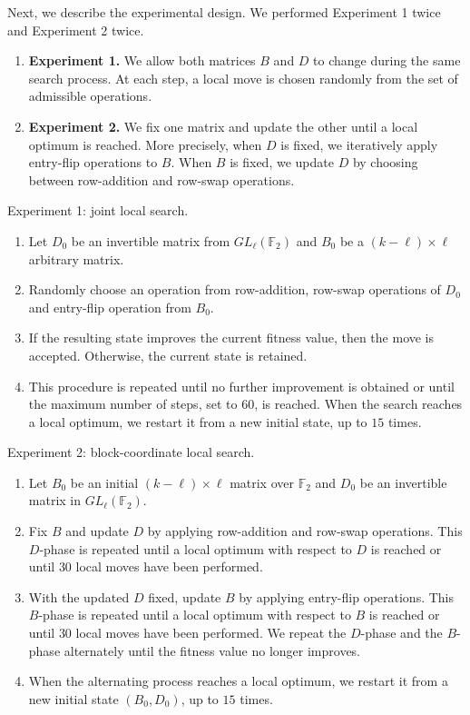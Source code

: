 \documentclass{article}
\theoremstyle{definition}
\theoremstyle{remark}
\begin{document}
Next, we describe the experimental design. We performed Experiment 1 twice and Experiment 2 twice.
    \begin{enumerate}
    \item \textbf{Experiment 1.} We allow both matrices $B$ and $D$ to change during the same search process. At each step, a local move is chosen randomly from the set of admissible operations.

    \item \textbf{Experiment 2.} We fix one matrix and update the other until a local optimum is reached. More precisely, when $D$ is fixed, we iteratively apply entry-flip operations to $B$. When $B$ is fixed, we update $D$ by choosing between row-addition and row-swap operations.
    \end{enumerate}

Experiment 1: joint local search.
    \begin{enumerate}
        \item Let $D_0$ be an invertible matrix from $GL_\ell(\mathbb{F}_2)$ and $B_0$ be a $(k-\ell)\times \ell$ arbitrary matrix.
        \item Randomly choose an operation from row-addition, row-swap operations of $D_0$ and entry-flip operation from $B_0$.
        \item If the resulting state improves the current fitness value, then the move is accepted. Otherwise, the current state is retained.
        \item This procedure is repeated until no further improvement is obtained or until the maximum number of steps, set to $60$, is reached. When the search reaches a local optimum, we restart it from a new initial state, up to $15$ times.
    \end{enumerate}

Experiment 2: block-coordinate local search.
    \begin{enumerate}
        \item Let $B_0$ be an initial $(k-\ell) \times \ell$ matrix over $\mathbb{F}_2$ and $D_0$ be an invertible matrix in $GL_\ell(\mathbb{F}_2)$.
        \item Fix $B$ and update $D$ by applying row-addition and row-swap operations. This $D$-phase is repeated until a local optimum with respect to $D$ is reached or until $30$ local moves have been performed.
        \item With the updated $D$ fixed, update $B$ by applying entry-flip operations. This $B$-phase is repeated until a local optimum with respect to $B$ is reached or until $30$ local moves have been performed. We repeat the $D$-phase and the $B$-phase alternately until the fitness value no longer improves.
        \item When the alternating process reaches a local optimum, we restart it from a new initial state $(B_0,D_0)$, up to $15$ times.
    \end{enumerate}
\end{document}
